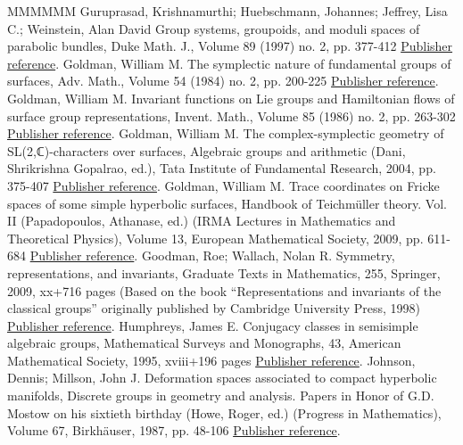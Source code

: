 \documentclass[11pt]{article}
\theoremstyle{definition}
\numberwithin{equation}{section}
\numberwithin{figure}{section}
\numberwithin{table}{section}
\begin{document}
\begin{thebibliography}{MMMMMM}
 Guruprasad, Krishnamurthi; Huebschmann, Johannes; Jeffrey, Lisa C.; Weinstein, Alan David Group systems, groupoids, and moduli spaces of parabolic bundles, Duke Math. J., Volume 89 (1997) no. 2, pp. 377-412 \href{https://ahl.centre-mersenne.org/item/AHL_2020__3__341_0/#GHJW}{Publisher reference}.
 Goldman, William M. The symplectic nature of fundamental groups of surfaces, Adv. Math., Volume 54 (1984) no. 2, pp. 200-225 \href{https://ahl.centre-mersenne.org/item/AHL_2020__3__341_0/#GoldmanAdvances}{Publisher reference}.
 Goldman, William M. Invariant functions on Lie groups and Hamiltonian flows of surface group representations, Invent. Math., Volume 85 (1986) no. 2, pp. 263-302 \href{https://ahl.centre-mersenne.org/item/AHL_2020__3__341_0/#GoldmanHamiltonian}{Publisher reference}.
 Goldman, William M. The complex-symplectic geometry of SL(2,ℂ)-characters over surfaces, Algebraic groups and arithmetic (Dani, Shrikrishna Gopalrao, ed.), Tata Institute of Fundamental Research, 2004, pp. 375-407 \href{https://ahl.centre-mersenne.org/item/AHL_2020__3__341_0/#GoldmanComplex}{Publisher reference}.
 Goldman, William M. Trace coordinates on Fricke spaces of some simple hyperbolic surfaces, Handbook of Teichmüller theory. Vol. II (Papadopoulos, Athanase, ed.) (IRMA Lectures in Mathematics and Theoretical Physics), Volume 13, European Mathematical Society, 2009, pp. 611-684 \href{https://ahl.centre-mersenne.org/item/AHL_2020__3__341_0/#Goldman09}{Publisher reference}.
 Goodman, Roe; Wallach, Nolan R. Symmetry, representations, and invariants, Graduate Texts in Mathematics, 255, Springer, 2009, xx+716 pages (Based on the book “Representations and invariants of the classical groups” originally published by Cambridge University Press, 1998) \href{https://ahl.centre-mersenne.org/item/AHL_2020__3__341_0/#GoodWall}{Publisher reference}.
 Humphreys, James E. Conjugacy classes in semisimple algebraic groups, Mathematical Surveys and Monographs, 43, American Mathematical Society, 1995, xviii+196 pages \href{https://ahl.centre-mersenne.org/item/AHL_2020__3__341_0/#Humphreys}{Publisher reference}.
 Johnson, Dennis; Millson, John J. Deformation spaces associated to compact hyperbolic manifolds, Discrete groups in geometry and analysis. Papers in Honor of G.D. Mostow on his sixtieth birthday (Howe, Roger, ed.) (Progress in Mathematics), Volume 67, Birkhäuser, 1987, pp. 48-106 \href{https://ahl.centre-mersenne.org/item/AHL_2020__3__341_0/#JohnsonMillson}{Publisher reference}.

\end{thebibliography}
\end{document}
